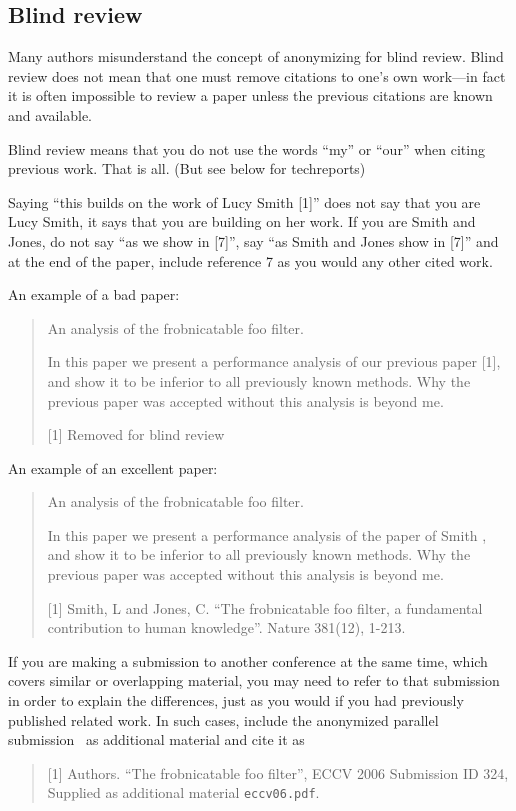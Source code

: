 \documentclass[10pt,twocolumn,letterpaper]{article}
\begin{document}
\subsection{Blind review}
\label{sec:blindreview}
Many authors misunderstand the concept of anonymizing for blind
review.  Blind review does not mean that one must remove
citations to one's own work---in fact it is often impossible to
review a paper unless the previous citations are known and
available.

Blind review means that you do not use the words ``my'' or ``our''
when citing previous work.  That is all.  (But see below for
techreports)

Saying ``this builds on the work of Lucy Smith [1]'' does not say
that you are Lucy Smith, it says that you are building on her
work.  If you are Smith and Jones, do not say ``as we show in
[7]'', say ``as Smith and Jones show in [7]'' and at the end of the
paper, include reference 7 as you would any other cited work.

An example of a bad paper:
\begin{quote}
\begin{center}
    An analysis of the frobnicatable foo filter.
\end{center}

   In this paper we present a performance analysis of our
   previous paper [1], and show it to be inferior to all
   previously known methods.  Why the previous paper was
   accepted without this analysis is beyond me.

   [1] Removed for blind review
\end{quote}


An example of an excellent paper:

\begin{quote}
\begin{center}
     An analysis of the frobnicatable foo filter.
\end{center}

   In this paper we present a performance analysis of the
   paper of Smith \etal [1], and show it to be inferior to
   all previously known methods.  Why the previous paper
   was accepted without this analysis is beyond me.

   [1] Smith, L and Jones, C. ``The frobnicatable foo
   filter, a fundamental contribution to human knowledge''.
   Nature 381(12), 1-213.
\end{quote}

If you are making a submission to another conference at the same time,
which covers similar or overlapping material, you may need to refer to that
submission in order to explain the differences, just as you would if you
had previously published related work.  In such cases, include the
anonymized parallel submission~\cite{Authors06} as additional material and
cite it as
\begin{quote}
[1] Authors. ``The frobnicatable foo filter'', ECCV 2006 Submission ID 324,
Supplied as additional material {\tt eccv06.pdf}.
\end{quote}
\end{document}
